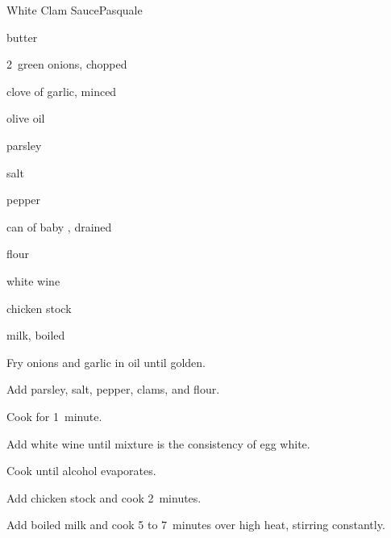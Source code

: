 \begin{recipe}{White Clam Sauce}{Pasquale}{}

\begin{ingredients}
\item {} butter
\item 2~green onions, chopped
\item clove of garlic, minced
\item olive oil
\item parsley
\item salt
\item pepper
\item can of baby , drained
\item {} flour
\item white wine
\item {} chicken stock
\item {} milk, boiled
\end{ingredients}

\begin{directions}
\item Fry onions and garlic in oil until golden.
\item Add parsley, salt, pepper, clams, and flour.
\item Cook for 1~minute.
\item Add white wine until mixture is the consistency of egg white.
\item Cook until alcohol evaporates.
\item Add chicken stock and cook 2~minutes.
\item Add boiled milk and cook 5 to 7~minutes over high heat, stirring constantly.
\end{directions}

\end{recipe}

